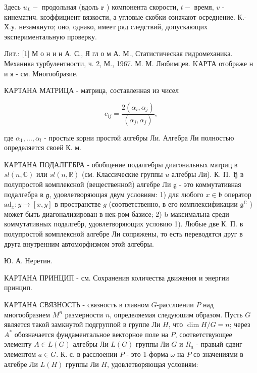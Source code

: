 \documentclass[10pt]{article}
\begin{document}
Здесь $u_{L}-$ продольная (вдоль $\boldsymbol{r}$ ) компонента скорости, $t-$ время, $v$ - кинематич. коэффициент вязкости, а угловые скобки означают осреднение. К.-Х.у. незамкнуто; оно, однако, имеет ряд следствий, допускающих экспериментальную проверку.



Лит.: [1] М о н и н А. С., Я гл о м А. М., Статистическая гидромеханика. Механика турбулентности, ч. 2, М., 1967. М. М. Любимцев. KАРТА отображе н и я - см. Многообразие.



КАРТАНА МАТРИЦА - матрица, составленная из чисел



\[

c_{i j}=\frac{2\left(\alpha_{i}, \alpha_{j}\right)}{\left(\alpha_{j}, \alpha_{j}\right)},

\]



где $\alpha_{1}, \ldots, \alpha_{l}$ - простые корни простой алгебры Ли. Алгебра Ли полностью определяется своей К. м.



КАРТАНА ПОДАЛГЕБРА - обобщение подалгебры диагональных матриц в $s l(n, \mathbb{C})$ или $s l(n, \mathbb{R})$ (см. Классические группы $u$ алгебры Ли). К. П. Ђ в полупростой комплексной (вещественной) алгебре Ли $\mathfrak{g}$ - это коммутативная подалгебра в $\mathfrak{g}$, удовлетворяющая двум условиям: 1) для любого $x \in \mathfrak{b}$ оператор $\mathrm{ad}_{x}: y \mapsto[x, y]$ в пространстве $g$ (соответственно, в его комплексификации $\mathfrak{g}^{\mathbb{C}}$ ) может быть диагонализирован в нек-ром базисе; 2) b максимальна среди коммутативных подалгебр, удовлетворяющих условию 1). Любые две К. П. в полупростой комплексной алгебре Ли сопряжены, то есть переводятся друг в друга внутренним автоморфизмом этой алгебры.



Ю. А. Неретин.



КАРТАНА ПРИНЦИП - см. Сохранения количества движения и энергии принцип.



КАРТАНА СВЯЗНОСТЬ - связность в главном $G$-расслоении $P$ над многообразием $M^{n}$ размерности $n$, определяемая следуюшим образом. Пусть $G$ является такой замкнутой подгруппой в группе Ли $H$, что $\operatorname{dim} H / G=n$; через $A^{*}$ обозначается фундаментальное векторное поле на $P$, соответствующее элементу $A \in L(G)$ алгебры Ли $L(G)$ группы Ли $G$ и $R_{a}$ - правый сдвиг элементом $a \in G$. К. с. в расслоении $P$ - это 1-форма $\omega$ на $P$ со значениями в алгебре Ли $L(H)$ группы Ли $H$, удовлетворяющая условиям:
\end{document}
